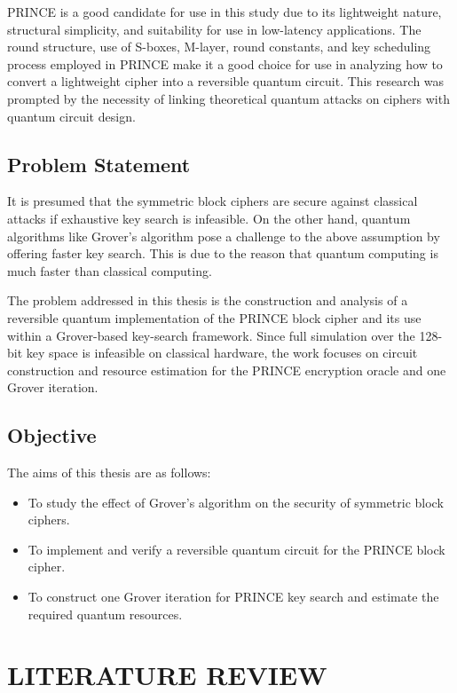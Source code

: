 \documentclass[12pt,a4paper]{report}
\begin{document}
PRINCE is a good candidate for use in this study due to its lightweight nature, structural simplicity, and suitability for use in low-latency applications. The round structure, use of S-boxes, M-layer, round constants, and key scheduling process employed in PRINCE make it a good choice for use in analyzing how to convert a lightweight cipher into a reversible quantum circuit. This research was prompted by the necessity of linking theoretical quantum attacks on ciphers with quantum circuit design.

\section{Problem Statement}

It is presumed that the symmetric block ciphers are secure against classical attacks if exhaustive key search is infeasible. On the other hand, quantum algorithms like Grover's algorithm pose a challenge to the above assumption by offering faster key search. This is due to the reason that quantum computing is much faster than classical computing.

The problem addressed in this thesis is the construction and analysis of a reversible quantum implementation of the PRINCE block cipher and its use within a Grover-based key-search framework. Since full simulation over the 128-bit key space is infeasible on classical hardware, the work focuses on circuit construction and resource estimation for the PRINCE encryption oracle and one Grover iteration.
\section{Objective}

The aims of this thesis are as follows:

\begin{itemize}
    \item To study the effect of Grover's algorithm on the security of symmetric block ciphers.
    \item To implement and verify a reversible quantum circuit for the PRINCE block cipher.
    \item To construct one Grover iteration for PRINCE key search and estimate the required quantum resources.
\end{itemize}

\cleardoublepage
\onehalfspacing
\chapter{LITERATURE REVIEW}
\end{document}
